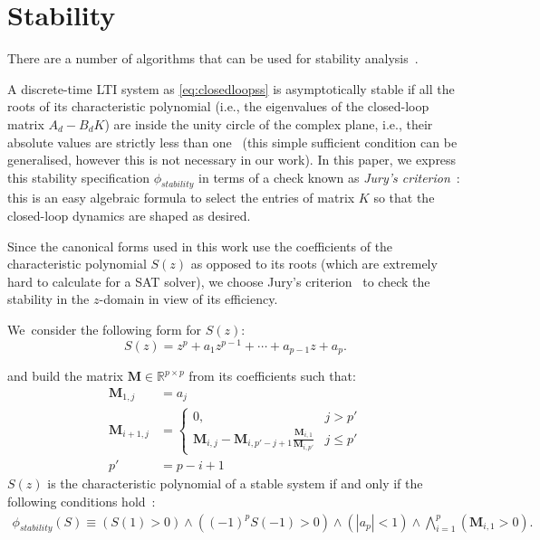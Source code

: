 \documentclass[sigconf]{llncs}
\newcommand{\mat}[1]{\boldsymbol{#1}}
\begin{document}
\section{Stability} 
\label{appendix:stabspecification}

There are a number of algorithms that can be
used for stability analysis~\cite{daes20161,Bessa16}.

A discrete-time LTI system as \eqref{eq:closedloopss} is
asymptotically stable if all the roots of its characteristic
polynomial (i.e., the eigenvalues of the closed-loop matrix $A_d - B_d
K$) are inside the unity circle of the complex plane, i.e., their
absolute values are strictly less than one~\cite{astrom1997computer}
(this simple sufficient condition can be generalised, however this is
not necessary in our work).  In this paper, we express this stability
specification $\phi_\mathit{stability}$ in terms of a check known as
\emph{Jury's criterion}~\cite{fadali}: this is an easy algebraic
formula to select the entries of matrix $K$ so that the closed-loop
dynamics are shaped as desired.



Since the canonical forms used in this work use the coefficients of the
characteristic polynomial $S(z)$ as opposed to its roots (which are
extremely hard to calculate for a SAT solver), we choose Jury's
criterion~\cite{astrom1997computer} to check the stability in the
$z$-domain in view of its efficiency.

We~consider the following form for $S(z)$:
%
\begin{equation*}
S(z) = z^{p}+a_1z^{p-1}+\cdots+a_{p-1}z+a_p.
\end{equation*}

and build the matrix
$\mat{M} \in \mathbb{R}^{p \times p}$ from its coefficients such that:
%
\begin{align*}
\mat{M}_{1,j}&=a_j\\
\mat{M}_{i+1,j}&=\left\{
\begin{array}{ll}
0,&j>p'\\
\mat{M}_{i,j}-\mat{M}_{i,p'-j+1}\frac{\mat{M}_{i,1}}{\mat{M}_{i,p'}} &j\leq p'
\end{array}
\right.\\
p'&=p-i+1
\end{align*}
%
$S(z)$ is the characteristic polynomial of a stable system if and
only if the following conditions hold~\cite{astrom1997computer}:
\begin{align*}
\phi_\mathit{stability}(S) \equiv
(S(1) > 0) \wedge ((-1)^p S(-1) > 0) \wedge (|a_p| < 1) \wedge \bigwedge\limits_{i=1}^p (\mat{M}_{i,1} > 0).
\end{align*}
\end{document}

